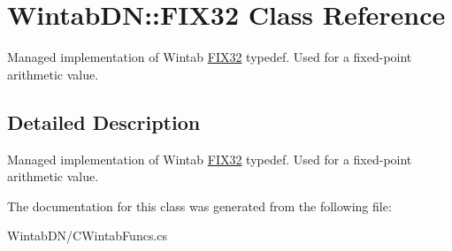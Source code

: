 \hypertarget{class_wintab_d_n_1_1_f_i_x32}{
\section{WintabDN::FIX32 Class Reference}
\label{class_wintab_d_n_1_1_f_i_x32}
}


Managed implementation of Wintab \hyperlink{class_wintab_d_n_1_1_f_i_x32}{FIX32} typedef. Used for a fixed-\/point arithmetic value.  




\subsection{Detailed Description}
Managed implementation of Wintab \hyperlink{class_wintab_d_n_1_1_f_i_x32}{FIX32} typedef. Used for a fixed-\/point arithmetic value. 

The documentation for this class was generated from the following file:\begin{DoxyCompactItemize}
\item 
WintabDN/CWintabFuncs.cs\end{DoxyCompactItemize}
